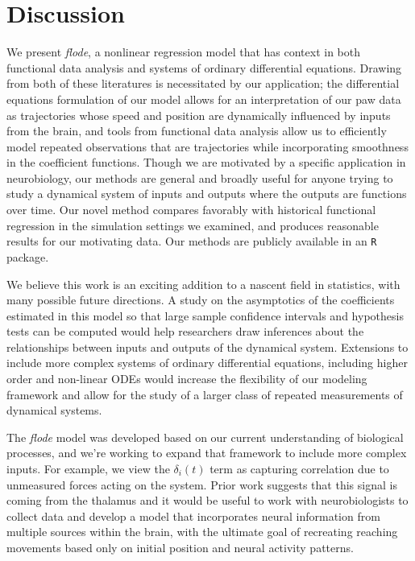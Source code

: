 \documentclass[preprint]{JASA}
\begin{document}
\hypertarget{discussion}{%
\section{Discussion}\label{discussion}}

\label{sec:discussion}

We present \emph{flode}, a nonlinear regression model that has context
in both functional data analysis and systems of ordinary differential
equations. Drawing from both of these literatures is necessitated by our
application; the differential equations formulation of our model allows
for an interpretation of our paw data as trajectories whose speed and
position are dynamically influenced by inputs from the brain, and tools
from functional data analysis allow us to efficiently model repeated
observations that are trajectories while incorporating smoothness in the
coefficient functions. Though we are motivated by a specific application
in neurobiology, our methods are general and broadly useful for anyone
trying to study a dynamical system of inputs and outputs where the
outputs are functions over time. Our novel method compares favorably
with historical functional regression in the simulation settings we
examined, and produces reasonable results for our motivating data. Our
methods are publicly available in an \texttt{R} package.

We believe this work is an exciting addition to a nascent field in
statistics, with many possible future directions. A study on the
asymptotics of the coefficients estimated in this model so that large
sample confidence intervals and hypothesis tests can be computed would
help researchers draw inferences about the relationships between inputs
and outputs of the dynamical system. Extensions to include more complex
systems of ordinary differential equations, including higher order and
non-linear ODEs would increase the flexibility of our modeling framework
and allow for the study of a larger class of repeated measurements of
dynamical systems.

The \emph{flode} model was developed based on our current understanding
of biological processes, and we're working to expand that framework to
include more complex inputs. For example, we view the \(\delta_i(t)\)
term as capturing correlation due to unmeasured forces acting on the
system. Prior work suggests that this signal is coming from the thalamus
and it would be useful to work with neurobiologists to collect data and
develop a model that incorporates neural information from multiple
sources within the brain, with the ultimate goal of recreating reaching
movements based only on initial position and neural activity patterns.
\end{document}
